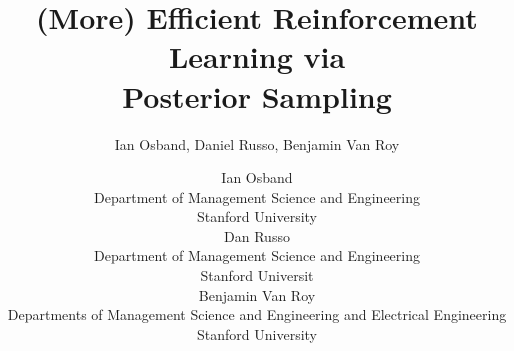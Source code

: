 \documentclass[10pt]{article}
\title{(More) Efficient Reinforcement Learning via \\ Posterior Sampling}
\author{Ian Osband, Daniel Russo, Benjamin Van Roy}
\author{
Ian Osband \\
Department of Management Science and Engineering\\
Stanford University \\
\And
Dan Russo \\
Department of Management Science and Engineering \\
Stanford Universit \\
\AND
Benjamin Van Roy \\
Departments of Management Science and Engineering and Electrical Engineering \\
Stanford University \\
}
\begin{document}
\maketitle

















\newpage

\small{


}

%
\end{document}
